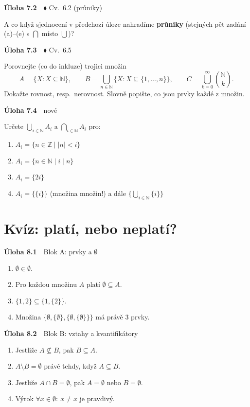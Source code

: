 \documentclass[11pt,a4paper]{article}
\newcommand{\N}{\mathbb N}\newcommand{\Z}{\mathbb Z}\newcommand{\Pot}{\mathcal P}
\newcommand{\pr}{\mathrel{\mid}}\newcommand{\nepr}{\mathrel{\nmid}}\newcommand{\sm}{\setminus}
\newenvironment{pol}{\begin{enumerate}[label=(\alph*),leftmargin=2em,itemsep=3pt]}{\end{enumerate}}
\newenvironment{uloha}[2]{\Needspace{6\baselineskip}\par\vspace{6pt}\noindent\textbf{Úloha #1}\ \ {\footnotesize\color{gray}#2}\par\vspace{2pt}}{\par\vspace{4pt}}
\begin{document}
\begin{uloha}{7.2}{$\blacklozenge$ Cv.~6.2 (průniky)}
A co když sjednocení v předchozí úloze nahradíme \textbf{průniky} (stejných pět zadání (a)--(e) s $\bigcap$ místo $\bigcup$)?

\end{uloha}

\begin{uloha}{7.3}{$\blacklozenge$ Cv.~6.5}
Porovnejte (co do inkluze) trojici množin
\[
A=\{X: X\subseteq\N\},\qquad B=\bigcup_{n\in\N}\{X: X\subseteq\{1,\dots,n\}\},\qquad C=\bigcup_{k=0}^{\infty}\binom{\N}{k}.
\]
Dokažte rovnost, resp.\ nerovnost. Slovně popište, co jsou prvky každé z množin.


\end{uloha}

\begin{uloha}{7.4}{nové}
Určete $\bigcup_{i\in\N}A_i$ a $\bigcap_{i\in\N}A_i$ pro:
\begin{pol}
  \item $A_i=\{n\in\Z\mid |n|<i\}$
  \item $A_i=\{n\in\N\mid i\pr n\}$
  \item $A_i=\{2i\}$
  \item $A_i=\{\{i\}\}$ (množina množin!) a dále $\Big\{\bigcup_{i\in\N}\{i\}\Big\}$
\end{pol}

\end{uloha}

\clearpage\section{Kvíz: platí, nebo neplatí?}

\begin{uloha}{8.1}{Blok A: prvky a $\emptyset$}
\begin{enumerate}[leftmargin=2em,itemsep=2pt]
  \item $\emptyset\in\emptyset$.
  \item Pro každou množinu $A$ platí $\emptyset\subseteq A$.
  \item $\{1,2\}\subseteq\{1,\{2\}\}$.
  \item Množina $\{\emptyset,\{\emptyset\},\{\emptyset,\{\emptyset\}\}\}$ má právě 3 prvky.
\end{enumerate}

\end{uloha}

\begin{uloha}{8.2}{Blok B: vztahy a kvantifikátory}
\begin{enumerate}[leftmargin=2em,itemsep=2pt,start=5]
  \item Jestliže $A\nsubseteq B$, pak $B\subseteq A$.
  \item $A\sm B=\emptyset$ právě tehdy, když $A\subseteq B$.
  \item Jestliže $A\cap B=\emptyset$, pak $A=\emptyset$ nebo $B=\emptyset$.
  \item Výrok $\forall x\in\emptyset:\ x\neq x$ je pravdivý.
\end{enumerate}

\end{uloha}
\end{document}
